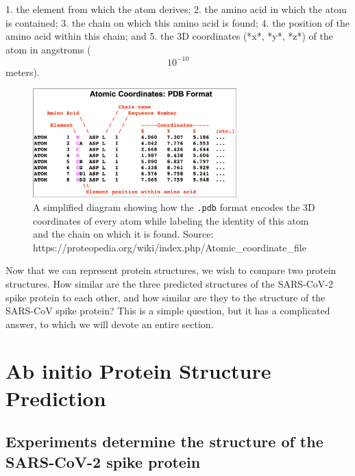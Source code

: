 {{1. the element from which the atom derives;
2. the amino acid in which the atom is contained;
3. the chain on which this amino acid is found;
4. the position of the amino acid within this chain; and
5. the 3D coordinates (*x*, *y*, *z*) of the atom in angstroms ($$10^{-10}$$ meters).

\begin{figure}[h]
	\centering
	\mySfFamily
	\includegraphics[width = 0.7\textwidth]{../images/simplifiedPDB.png}
	\caption{A simplified diagram showing how the \texttt{.pdb} format encodes the 3D coordinates of every atom while labeling the identity of this atom and the chain on which it is found. Source: https://proteopedia.org/wiki/index.php/Atomic_coordinate_file}
	\label{fig:simplifiedPDB}
\end{figure}

\begin{note}[%
The above figure shows just part of the information needed to fully represent a protein structure. For example, a \texttt{.pdb} file will also contain information about the disulfide bonds between amino acids. For more information, check out the <a href="http://www.wwpdb.org/documentation/file-format" target="_blank">official PDB documentation</a>).
]\end{note}

Now that we can represent protein structures, we wish to compare two protein structures. How similar are the three predicted structures of the SARS-CoV-2 spike protein to each other, and how similar are they to the structure of the SARS-CoV spike protein? This is a simple question, but it has a complicated answer, to which we will devote an entire section.

\FloatBarrier
{}

\section{Ab initio Protein Structure Prediction}
\label{sec:accuracy}
\subsection{Experiments determine the structure of the SARS-CoV-2 spike protein}

}}
